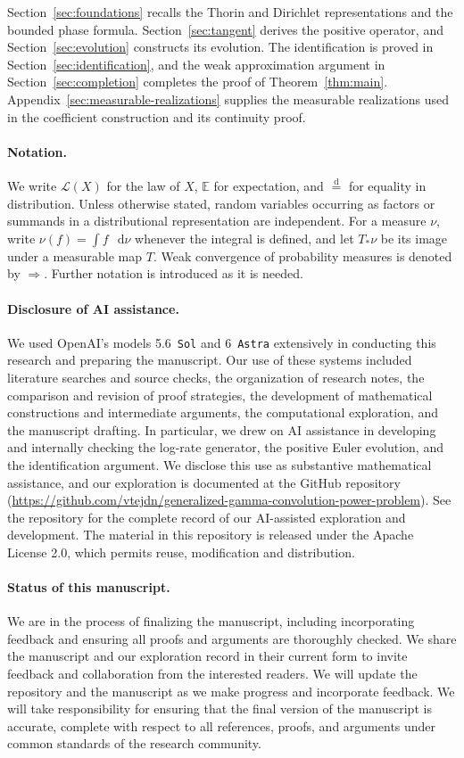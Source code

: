 \documentclass[11pt]{article}
\theoremstyle{definition}
\theoremstyle{remark}
\newcommand{\E}{\mathbb E}
\newcommand{\Law}{\mathcal L}
\newcommand{\dd}{\mathop{}\!\mathrm d}
\begin{document}
Section~\ref{sec:foundations} recalls the Thorin and Dirichlet representations and the bounded phase formula.
Section~\ref{sec:tangent} derives the positive operator, and Section~\ref{sec:evolution} constructs its evolution.
The identification is proved in Section~\ref{sec:identification}, and the weak approximation argument in Section~\ref{sec:completion} completes the proof of Theorem~\ref{thm:main}.
Appendix~\ref{sec:measurable-realizations} supplies the measurable realizations used in the coefficient construction and its continuity proof.

\paragraph{Notation.}
We write $\Law(X)$ for the law of $X$, $\E$ for expectation, and $\overset{\mathrm d}=$ for equality in distribution.
Unless otherwise stated, random variables occurring as factors or summands in a distributional representation are independent.
For a measure $\nu$, write $\nu(f)=\int f\,\dd\nu$ whenever the integral is defined, and let $T_*\nu$ be its image under a measurable map $T$.
Weak convergence of probability measures is denoted by $\Rightarrow$.
Further notation is introduced as it is needed.

\paragraph{Disclosure of AI assistance.}
We used OpenAI's models 5.6~\texttt{Sol} and 6~\texttt{Astra} extensively in conducting this research and preparing the manuscript.
Our use of these systems included literature searches and source checks, the organization of research notes, the comparison and revision of proof strategies, the development of mathematical constructions and intermediate arguments, the computational exploration, and the manuscript drafting.
In particular, we drew on AI assistance in developing and internally checking the log-rate generator, the positive Euler evolution, and the identification argument.
We disclose this use as substantive mathematical assistance, and our exploration is documented at the GitHub repository (\url{https://github.com/vtejdn/generalized-gamma-convolution-power-problem}).
See the repository for the complete record of our AI-assisted exploration and development.
The material in this repository is released under the Apache License 2.0, which permits reuse, modification and distribution.

\paragraph{Status of this manuscript.}
We are in the process of finalizing the manuscript, including incorporating feedback and ensuring all proofs and arguments are thoroughly checked.
We share the manuscript and our exploration record in their current form to invite feedback and collaboration from the interested readers.
We will update the repository and the manuscript as we make progress and incorporate feedback.
We will take responsibility for ensuring that the final version of the manuscript is accurate, complete with respect to all references, proofs, and arguments under common standards of the research community.
\end{document}

